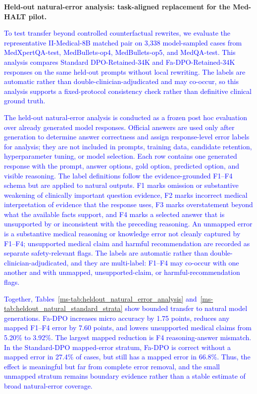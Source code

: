 \documentclass[12pt]{article}
\newcommand{\added}[1]{\textcolor{blue}{#1}}
\begin{document}
\textbf{Held-out natural-error analysis: task-aligned replacement for the Med-HALT pilot.}
\begin{displayquote}
\added{To test transfer beyond controlled counterfactual rewrites, we evaluate the representative II-Medical-8B matched pair on 3,338 model-sampled cases from MedXpertQA-test, MedBullets-op4, MedBullets-op5, and MedQA-test. This analysis compares Standard DPO-Retained-34K and Fa-DPO-Retained-34K responses on the same held-out prompts without local rewriting. The labels are automatic rather than double-clinician-adjudicated and may co-occur, so this analysis supports a fixed-protocol consistency check rather than definitive clinical ground truth.}

\added{The held-out natural-error analysis is conducted as a frozen post hoc evaluation over already generated model responses. Official answers are used only after generation to determine answer correctness and assign response-level error labels for analysis; they are not included in prompts, training data, candidate retention, hyperparameter tuning, or model selection. Each row contains one generated response with the prompt, answer options, gold option, predicted option, and visible reasoning. The label definitions follow the evidence-grounded F1--F4 schema but are applied to natural outputs. F1 marks omission or substantive weakening of clinically important question evidence, F2 marks incorrect medical interpretation of evidence that the response uses, F3 marks overstatement beyond what the available facts support, and F4 marks a selected answer that is unsupported by or inconsistent with the preceding reasoning. An unmapped error is a substantive medical reasoning or knowledge error not cleanly captured by F1--F4; unsupported medical claim and harmful recommendation are recorded as separate safety-relevant flags. The labels are automatic rather than double-clinician-adjudicated, and they are multi-label: F1--F4 may co-occur with one another and with unmapped, unsupported-claim, or harmful-recommendation flags.}

\added{Together, Tables~\ref*{ms-tab:heldout_natural_error_analysis} and~\ref*{ms-tab:heldout_natural_standard_strata} show bounded transfer to natural model generations. Fa-DPO increases micro accuracy by 1.75 points, reduces any mapped F1--F4 error by 7.60 points, and lowers unsupported medical claims from 5.20\% to 3.92\%. The largest mapped reduction is F4 reasoning-answer mismatch. In the Standard-DPO mapped-error stratum, Fa-DPO is correct without a mapped error in 27.4\% of cases, but still has a mapped error in 66.8\%. Thus, the effect is meaningful but far from complete error removal, and the small unmapped stratum remains boundary evidence rather than a stable estimate of broad natural-error coverage.}
\end{displayquote}
\end{document}
